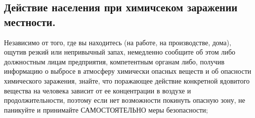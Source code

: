 \documentclass[a4paper, 12pt]{article}
\theoremstyle{definition}
\begin{document}
        \subsection{Действие населения при химичсеком заражении местности.}

        Независимо от того, где вы находитесь (на работе, на производстве, дома), ощутив резкий или непривычный запах, немедленно сообщите об этом либо должностным лицам предприятия, компетентным органам либо, получив информацию о выбросе в атмосферу химически опасных веществ и об опасности химического заражения, знайте, что поражающее действие конкретной ядовитого вещества на человека зависит от ее концентрации в воздухе и продолжительности, поэтому если нет возможности покинуть опасную зону, не паникуйте и принимайте САМОСТОЯТЕЛЬНО  меры безопасности;
\end{document}
